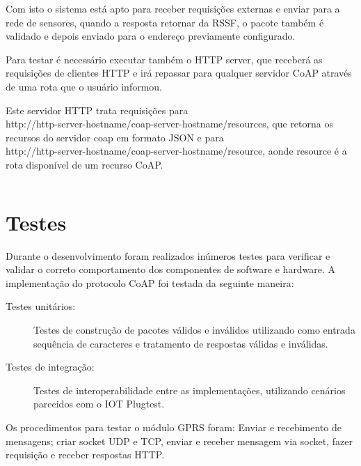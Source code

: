 Com isto o sistema est\'a apto para receber requisi\c{c}\~oes externas e enviar para a rede de sensores, quando a resposta retornar da RSSF, o pacote tamb\'em \'e validado e depois enviado para o endere\c{c}o previamente configurado.

Para testar \'e necess\'ario executar tamb\'em o HTTP server, que receber\'a as requisi\c{c}\~oes de clientes HTTP e ir\'a repassar para qualquer servidor CoAP atrav\'es de uma rota que o usu\'ario informou.

Este servidor HTTP trata requisi\c{c}\~oes para\\http://http-server-hostname/coap-server-hostname/resources, que retorna os recursos do servidor coap em formato JSON e para\\http://http-server-hostname/coap-server-hostname/resource, aonde resource \'e a rota dispon\'ivel de um recurso CoAP.

\begin{lstlisting}
\end{lstlisting}

\section{Testes}

Durante o desenvolvimento foram realizados in\'umeros testes para verificar e validar o correto comportamento dos componentes de software e hardware.  A implementa\c{c}\~ao do protocolo CoAP foi testada da seguinte maneira:

\begin{description}
    \item[Testes unit\'arios:] Testes de constru\c{c}\~ao de pacotes v\'alidos e inv\'alidos utilizando como entrada sequ\^encia de caracteres e tratamento de respostas v\'alidas e inv\'alidas.
    \item[Testes de integra\c{c}\~ao:] Testes de interoperabilidade entre as implementa\c{c}\~oes, utilizando cen\'arios parecidos com o IOT Plugtest.
\end{description}

Os procedimentos para testar o m\'odulo GPRS foram: Enviar e recebimento de mensagens; criar socket UDP e TCP, enviar e receber mensagem via socket, fazer requisi\c{c}\~ao e receber respostas HTTP.
